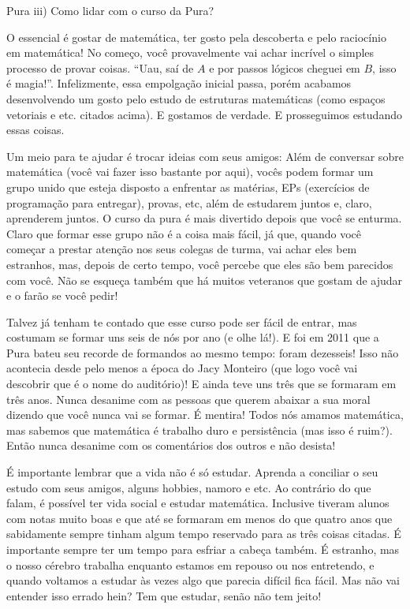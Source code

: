 \begin{subsecao}{Pura}
iii) Como lidar com o curso da Pura?

O essencial é gostar de matemática, ter gosto pela descoberta e pelo raciocínio
em matemática! No começo, você provavelmente vai achar incrível o simples processo
de provar coisas. ``Uau, saí de $A$ e por passos lógicos cheguei em $B$, isso é
magia!''. Infelizmente, essa empolgação inicial passa, porém acabamos desenvolvendo
um gosto pelo estudo de estruturas matemáticas (como espaços vetoriais e etc.
citados acima). E gostamos de verdade. E prosseguimos estudando essas coisas.

Um meio para te ajudar é trocar ideias com seus amigos: Além de conversar
sobre matemática (você vai fazer isso bastante por aqui), vocês podem formar um
grupo unido que esteja disposto a enfrentar as matérias, EPs (exercícios de
programação para entregar), provas, etc, além de estudarem juntos e, claro,
aprenderem juntos. O curso da pura é mais divertido depois que você se enturma. Claro que
formar esse grupo não é a coisa mais fácil, já que, quando você começar a
prestar atenção nos seus colegas de turma, vai achar eles bem estranhos, mas,
depois de certo tempo, você percebe que eles são bem parecidos com você. Não se
esqueça também que há muitos veteranos que gostam de ajudar e o farão se você pedir!

Talvez já tenham te contado que esse curso pode ser fácil de entrar, mas
costumam se formar uns seis de nós por ano (e olhe lá!). E foi em 2011 que a Pura
bateu seu recorde de formandos ao mesmo tempo: foram dezesseis! Isso não acontecia
desde pelo menos a época do Jacy Monteiro (que logo você vai descobrir que é o
nome do auditório)! E ainda teve uns três que se formaram em
três anos. Nunca desanime com as pessoas que querem abaixar a sua moral dizendo
que você nunca vai se formar. É mentira! Todos nós amamos matemática, mas sabemos
que matemática é trabalho duro e persistência (mas isso é ruim?). Então nunca
desanime com os comentários dos outros e não desista!

É importante lembrar que a vida não é só estudar. Aprenda a conciliar o seu estudo
com seus amigos, alguns hobbies, namoro e etc. Ao contrário do que falam, é
possível ter vida social e estudar matemática. Inclusive tiveram alunos com notas
muito boas e que até se formaram em menos do que quatro anos que sabidamente
sempre tinham algum tempo reservado para as três coisas citadas. É importante
sempre ter um tempo para esfriar a cabeça também. É estranho, mas o nosso cérebro
trabalha enquanto estamos em repouso ou nos entretendo, e quando voltamos a estudar
às vezes algo que parecia difícil fica fácil. Mas não vai entender isso errado
hein? Tem que estudar, senão não tem jeito!


\end{subsecao}
